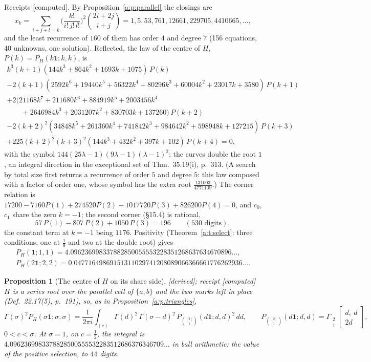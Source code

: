 \documentclass[11pt]{article}
\newcommand{\one}{\mathbf 1}
\newcommand{\Gst}[4]{\Gamma_{\substack{#1\\#2}}\!\begin{bmatrix}#3\\#4\end{bmatrix}}
\theoremstyle{plain}
\newtheorem{proposition}{Proposition}[section]
\theoremstyle{definition}
\theoremstyle{remark}
\newcommand{\derived}{\textup{[derived]}}
\newcommand{\computed}{\textup{[computed]}}
\begin{document}
\noindent Receipts \computed. By Proposition~\ref{a:p:parallel} the closings are
\[
x_k=\sum_{i+j+l=k}\Big(\frac{k!}{i!\,j!\,l!}\Big)^2\binom{2i+2j}{i+j}=1,5,53,761,12661,229705,4410665,\dots,
\]
and the least recurrence of $160$ of them has order $4$ and degree $7$ (156 equations, 40 unknowns, one solution). Reflected, the law of the centre of $H$, $P(k)=P_H(k\one;k,k)$, is
\begin{gather*}
k^3(k+1)(144k^3+864k^2+1693k+1075)\,P(k)\\
-2(k+1)(2592k^6+19440k^5+56322k^4+80296k^3+60004k^2+23017k+3580)\,P(k+1)\\
+2(21168k^7+211680k^6+884919k^5+2003456k^4\\
\qquad+2646984k^3+2031207k^2+830703k+137260)\,P(k+2)\\
-2(k+2)^2(34848k^5+261360k^4+741842k^3+984642k^2+598948k+127215)\,P(k+3)\\
+225(k+2)^2(k+3)^2(144k^3+432k^2+397k+102)\,P(k+4)=0,
\end{gather*}
with the symbol $144(25\lambda-1)(9\lambda-1)(\lambda-1)^2$: the curves double the root $1$, an integral direction in the exceptional set of Thm.~35.19(i), p.~313. (A search by total size first returns a recurrence of order $5$ and degree $5$: this law composed with a factor of order one, whose symbol has the extra root $\frac{131003}{4771109}$.) The corner relation is $17200-7160P(1)+274520P(2)-1017720P(3)+826200P(4)=0$, and $c_0$, $c_1$ share the zero $k=-1$; the second corner (\S15.4) is rational,
\[
57\,P(1)-807\,P(2)+1050\,P(3)=196\qquad(530\text{ digits}),
\]
the constant term at $k=-1$ being $1176$. Positivity (Theorem~\ref{a:t:select}: three conditions, one at $\frac19$ and two at the double root) gives
\begin{gather*}
P_H(\one;1,1)=4.096236998337882850055553228351268637634670896\ldots,\\
P_H(2\one;2,2)=0.04771649869151311029741208089066366661776262936\ldots .
\end{gather*}

\begin{proposition}[The centre of $H$ on its share side]\label{a:p:Hshare}\derived; receipt \computed\
$H$ is a series root over the parallel cell of $\{a,b\}$ and the two marks left in place (Def.~22.17(5), p.~191), so, as in Proposition~\ref{a:p:triangles},
\[
\Gamma(\sigma)^2P_H(\sigma\one;\sigma,\sigma)=\frac1{2\pi i}\int_{(c)}\Gamma(d)^2\,\Gamma(\sigma-d)^2\,P_{\binom{[2]}1}(d\one;d,d)^2\,dd,\qquad P_{\binom{[2]}1}(d\one;d,d)=\Gst21{d,\ d}{2d},
\]
$0<c<\sigma$. At $\sigma=1$, on $c=\frac12$, the integral is $4.0962369983378828500555532283512686376346709\ldots$ in ball arithmetic: the value of the positive selection, to $44$ digits.
\end{proposition}
\end{document}
